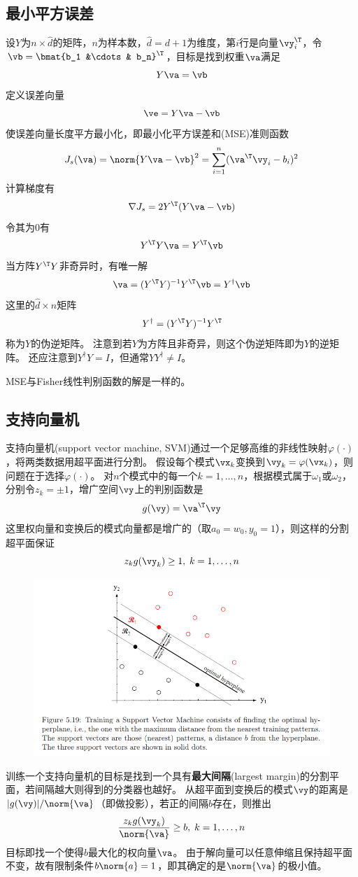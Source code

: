 \subsection{最小平方误差}
设$Y$为$n\times\hat{d}$的矩阵，$n$为样本数，$\hat{d}=d+1$为维度，第$i$行是向量$\vy_i^\T$，令$\vb=\bmat{b_1 &\cdots & b_n}^\T$，目标是找到权重$\va$满足
\[Y\va=\vb\]
定义误差向量
\[\ve=Y\va-\vb\]
使误差向量长度平方最小化，即最小化平方误差和(MSE)准则函数
\[J_s(\va)=\norm{Y\va-\vb}^2=\sum_{i=1}^n(\va^\T\vy_i-b_i)^2\]
计算梯度有
\[\nabla J_s=2Y^\T(Y\va-\vb)\]
令其为$0$有
\[Y^\T Y\va=Y^\T\vb\]
当方阵$Y^\T Y$非奇异时，有唯一解
\[\va=(Y^\T Y)^{-1} Y^\T\vb=Y^\dag\vb\]
这里的$\hat{d}\times n$矩阵
\[Y^\dag=(Y^\T Y)^{-1} Y^\T\]
称为$Y$的伪逆矩阵。
注意到若$Y$为方阵且非奇异，则这个伪逆矩阵即为$Y$的逆矩阵。
还应注意到$Y^\dag Y=I$，但通常$YY^\dag\ne I$。

MSE与Fisher线性判别函数的解是一样的。

\subsection{支持向量机}
支持向量机(support vector machine, SVM)通过一个足够高维的非线性映射$\varphi(\cdot)$，将两类数据用超平面进行分割。
假设每个模式$\vx_k$变换到$\vy_k=\varphi(\vx_k)$，则问题在于选择$\varphi(\cdot)$。
对$n$个模式中的每一个$k=1,\ldots,n$，根据模式属于$\omega_1$或$\omega_2$，分别令$z_k=\pm 1$，增广空间$\vy$上的判别函数是
\[g(\vy)=\va^\T\vy\]
这里权向量和变换后的模式向量都是增广的（取$a_0=w_0,y_0=1$），则这样的分割超平面保证
\[z_kg(\vy_k)\geq 1,\;k=1,\ldots,n\]
\begin{figure}[H]
\centering
\includegraphics[width=0.9\linewidth]{fig/SVM.png}
\end{figure}

训练一个支持向量机的目标是找到一个具有\textbf{最大间隔}(largest margin)的分割平面，若间隔越大则得到的分类器也越好。
从超平面到变换后的模式$\vy$的距离是$|g(\vy)|/\norm{\va}$（即做投影），若正的间隔$b$存在，则推出
\[\frac{z_kg(\vy_k)}{\norm{\va}}\geq b,\;k=1,\ldots,n\]
目标即找一个使得$b$最大化的权向量$\va$。
由于解向量可以任意伸缩且保持超平面不变，故有限制条件$b\norm{a}=1$，即其确定的是$\norm{\va}$的极小值。

